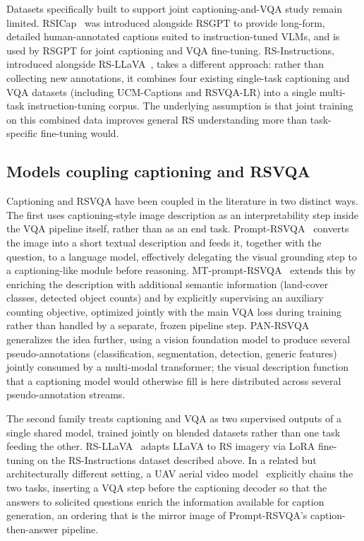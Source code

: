 Datasets specifically built to support joint captioning-and-VQA study remain limited. RSICap~\cite{hu2023rsgpt} was introduced alongside RSGPT to provide long-form, detailed human-annotated captions suited to instruction-tuned VLMs, and is used by RSGPT for joint captioning and VQA fine-tuning. RS-Instructions, introduced alongside RS-LLaVA~\cite{diallo2024rsllava}, takes a different approach: rather than collecting new annotations, it combines four existing single-task captioning and VQA datasets (including UCM-Captions and RSVQA-LR) into a single multi-task instruction-tuning corpus. The underlying assumption is that joint training on this combined data improves general RS understanding more than task-specific fine-tuning would.

\subsection{Models coupling captioning and RSVQA}
\label{sec:rw-captioning-models}

Captioning and RSVQA have been coupled in the literature in two distinct ways. The first uses captioning-style image description as an interpretability step inside the VQA pipeline itself, rather than as an end task. Prompt-RSVQA~\cite{chappuis2022promptrsvqa} converts the image into a short textual description and feeds it, together with the question, to a language model, effectively delegating the visual grounding step to a captioning-like module before reasoning. MT-prompt-RSVQA~\cite{chappuis2023multitask} extends this by enriching the description with additional semantic information (land-cover classes, detected object counts) and by explicitly supervising an auxiliary counting objective, optimized jointly with the main VQA loss during training rather than handled by a separate, frozen pipeline step. PAN-RSVQA~\cite{chappuis2025pan} generalizes the idea further, using a vision foundation model to produce several pseudo-annotations (classification, segmentation, detection, generic features) jointly consumed by a multi-modal transformer; the visual description function that a captioning model would otherwise fill is here distributed across several pseudo-annotation streams.

The second family treats captioning and VQA as two supervised outputs of a single shared model, trained jointly on blended datasets rather than one task feeding the other. RS-LLaVA~\cite{diallo2024rsllava} adapts LLaVA to RS imagery via LoRA fine-tuning on the RS-Instructions dataset described above. In a related but architecturally different setting, a UAV aerial video model~\cite{uav2024videocaptioning} explicitly chains the two tasks, inserting a VQA step before the captioning decoder so that the answers to solicited questions enrich the information available for caption generation, an ordering that is the mirror image of Prompt-RSVQA's caption-then-answer pipeline.

